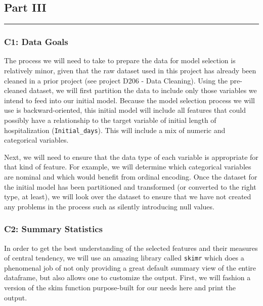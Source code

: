 \documentclass[
]{article}
\begin{document}
\hypertarget{part-iii}{%
\subsection{Part III}\label{part-iii}}

\begin{center}\rule{0.5\linewidth}{0.5pt}\end{center}

\hypertarget{c1-data-goals}{%
\subsubsection{C1: Data Goals}\label{c1-data-goals}}

The process we will need to take to prepare the data for model selection
is relatively minor, given that the raw dataset used in this project has
already been cleaned in a prior project (see project D206 - Data
Cleaning). Using the pre-cleaned dataset, we will first partition the
data to include only those variables we intend to feed into our initial
model. Because the model selection process we will use is
backward-oriented, this initial model will include all features that
could possibly have a relationship to the target variable of initial
length of hospitalization (\texttt{Initial\_days}). This will include a
mix of numeric and categorical variables.

Next, we will need to ensure that the data type of each variable is
appropriate for that kind of feature. For example, we will determine
which categorical variables are nominal and which would benefit from
ordinal encoding. Once the dataset for the initial model has been
partitioned and transformed (or converted to the right type, at least),
we will look over the dataset to ensure that we have not created any
problems in the process such as silently introducing null values.

\hypertarget{c2-summary-statistics}{%
\subsubsection{C2: Summary Statistics}\label{c2-summary-statistics}}

In order to get the best understanding of the selected features and
their measures of central tendency, we will use an amazing library
called \texttt{skimr} which does a phenomenal job of not only providing
a great default summary view of the entire dataframe, but also allows
one to customize the output. First, we will fashion a version of the
skim function purpose-built for our needs here and print the output.
\end{document}
